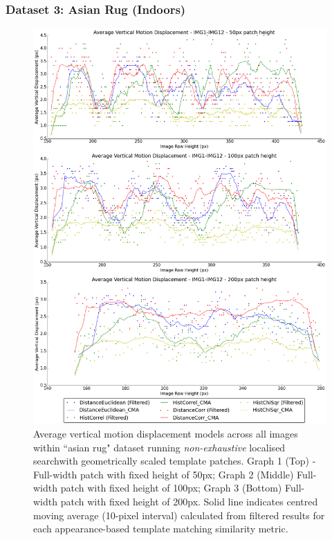 \clearpage
\subsubsection{Dataset 3: Asian Rug (Indoors)}

\begin{figure}[ht!]
\centering
\includegraphics[scale=0.3]{images/results/wiltshire_inside_10cm_scaled}
\caption{Average vertical motion displacement models across all images within ``asian rug" dataset running \textit{non-exhaustive} localised searchwith geometrically scaled template patches. Graph 1 (Top) - Full-width patch with fixed height of 50px; Graph 2 (Middle) Full-width patch with fixed height of 100px; Graph 3 (Bottom) Full-width patch with fixed height of 200px. Solid line indicates centred moving average (10-pixel interval) calculated from filtered results for each appearance-based template matching similarity metric.}
\label{fig:ex3_3_1}
\end{figure}

